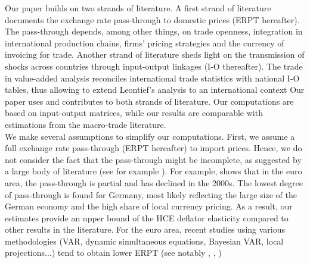\documentclass[11pt,a4paper]{paper} %
\begin{document}
Our paper builds on two strands of literature. 
A first strand of literature documents the exchange rate pass-through to domestic prices (ERPT hereafter). 
The pass-through depends, among other things, on trade openness, integration in international production chains, firms' pricing strategies and the currency of invoicing for trade.
Another strand of literature sheds light on the transmission of shocks across countries through input-output linkages (I-O thereafter).
The trade in value-added analysis reconciles international trade statistics with national I-O tables, thus allowing to extend Leontief's analysis \citep{Leontief1951} to an international context
Our paper uses and contributes to both strands of literature. 
Our computations are based on input-output matrices, while our results are comparable with estimations from the macro-trade literature. \\
We make several assumptions to simplify our computations. 
First, we assume a full exchange rate pass-through (ERPT hereafter) to import prices. 
Hence, we do not consider the fact that the pass-through might be incomplete, as suggested by a large body of literature (see for example \cite{Berman2012}). For example, \cite{Ozyurt2016} shows that in the euro area, the pass-through is partial and has declined in the 2000s. The lowest degree of pass-through is found for Germany, most likely reflecting the large size of the German economy and the high share of local currency pricing. 
As a result, our estimates provide an upper bound of the HCE deflator elasticity compared to other results in the literature. For the euro area, recent studies using various methodologies (VAR, dynamic simultaneous equations, Bayesian VAR, local projections...) tend to obtain lower ERPT (see notably \cite{Hahn2003}, \cite{Comunale2017}, \cite{Colavecchio2020}) \\
\end{document}

